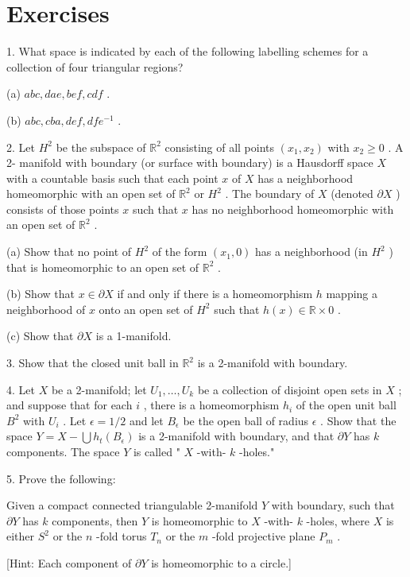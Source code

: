 \section*{Exercises}

1. What space is indicated by each of the following labelling schemes for a collection of four triangular regions?

(a) \({abc},{dae},{bef},{cdf}\) .

(b) \({abc},{cba},{def},{df}{e}^{-1}\) .

2. Let \({H}^{2}\) be the subspace of \({\mathbb{R}}^{2}\) consisting of all points \(\left( {{x}_{1},{x}_{2}}\right)\) with \({x}_{2} \geq  0\) . A 2- manifold with boundary (or surface with boundary) is a Hausdorff space \(X\) with a countable basis such that each point \(x\) of \(X\) has a neighborhood homeomorphic with an open set of \({\mathbb{R}}^{2}\) or \({H}^{2}\) . The boundary of \(X\) (denoted \(\partial X\) ) consists of those points \(x\) such that \(x\) has no neighborhood homeomorphic with an open set of \({\mathbb{R}}^{2}\) .

(a) Show that no point of \({H}^{2}\) of the form \(\left( {{x}_{1},0}\right)\) has a neighborhood (in \({H}^{2}\) ) that is homeomorphic to an open set of \({\mathbb{R}}^{2}\) .

(b) Show that \(x \in  \partial X\) if and only if there is a homeomorphism \(h\) mapping a neighborhood of \(x\) onto an open set of \({H}^{2}\) such that \(h\left( x\right)  \in  \mathbb{R} \times  0\) .

(c) Show that \(\partial X\) is a 1-manifold.

3. Show that the closed unit ball in \({\mathbb{R}}^{2}\) is a 2-manifold with boundary.

4. Let \(X\) be a 2-manifold; let \({U}_{1},\ldots ,{U}_{k}\) be a collection of disjoint open sets in \(X\) ; and suppose that for each \(i\) , there is a homeomorphism \({h}_{i}\) of the open unit ball \({B}^{2}\) with \({U}_{i}\) . Let \(\epsilon  = 1/2\) and let \({B}_{\epsilon }\) be the open ball of radius \(\epsilon\) . Show that the space \(Y = X - \bigcup {h}_{t}\left( {B}_{\epsilon }\right)\) is a 2-manifold with boundary, and that \(\partial Y\) has \(k\) components. The space \(Y\) is called " \(X\) -with- \(k\) -holes."

5. Prove the following:

\begin{theorem} Given a compact connected triangulable 2-manifold \(Y\) with boundary, such that \(\partial Y\) has \(k\) components, then \(Y\) is homeomorphic to \(X\) -with- \(k\) -holes, where \(X\) is either \({S}^{2}\) or the \(n\) -fold torus \({T}_{n}\) or the \(m\) -fold projective plane \({P}_{m}\) .
\end{theorem}

[Hint: Each component of \(\partial Y\) is homeomorphic to a circle.]